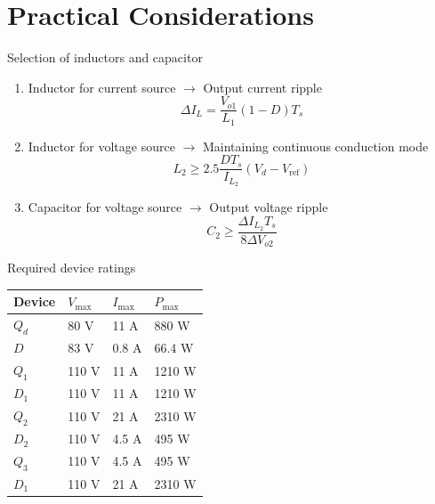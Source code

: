 \documentclass[10pt]{beamer}
\begin{document}
\section{Practical Considerations}
\begin{frame}{Selection of inductors and capacitor}
\begin{enumerate}
\item Inductor for current source $\rightarrow$ Output current ripple
  \begin{equation}
    \Delta I_L = \dfrac{V_{o1}}{L_1} (1-D) T_s
    \label{eq:ind-1}
  \end{equation}
\item Inductor for voltage source $\rightarrow$ Maintaining continuous conduction mode
  \begin{equation}
    L_2 \geq 2.5\dfrac{DT_s}{I_{L_2}}(V_d-V_{\text{ref}})
    \label{eq:ind-4}
  \end{equation}
\item Capacitor for voltage source $\rightarrow$ Output voltage ripple
  \begin{equation}
    C_2 \geq \dfrac{\Delta I_{L_2}T_s}{8\Delta V_{o2}}
    \label{eq:ind-4a}
  \end{equation}
\end{enumerate}
\end{frame}

\begin{frame}{Required device ratings}
\begin{table}
  \begin{tabular}{l | l l l}
    \hline
    Device & $V_{\text{max}}$ & $I_{\text{max}}$ & $P_{\text{max}}$ \\
    \hline
    $Q_d$ & 80 V & 11 A & 880 W \\
    $D$ & 83 V & 0.8 A & 66.4 W \\
    $Q_1$ & 110 V & 11 A & 1210 W \\
    $D_1$ & 110 V & 11 A & 1210 W \\
    $Q_2$ & 110 V & 21 A & 2310 W \\
    $D_2$ & 110 V & 4.5 A & 495 W \\
    $Q_3$ & 110 V & 4.5 A & 495 W\\
    $D_1$ & 110 V & 21 A & 2310 W
  \end{tabular}
\end{table}
\end{frame}
\end{document}
